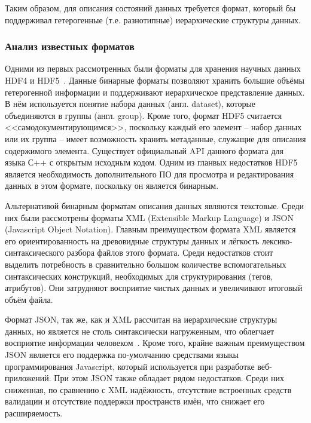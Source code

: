 Таким образом, для описания состояний данных требуется формат, который бы поддерживал гетерогенные (т.е. разнотипные) иерархические структуры данных.

\subsubsection{Анализ известных форматов}

Одними из первых рассмотренных были форматы для хранения научных данных HDF4 и HDF5~\cite{HDFOffCite}. Данные бинарные форматы позволяют хранить большие объёмы гетерогенной информации и поддерживают иерархическое представление данных. В нём используется понятие набора данных (англ. dataset), которые объединяются в группы (англ. group). Кроме того, формат HDF5 считается <<самодокументирующимся>>, поскольку каждый его элемент -- набор данных или их группа -- имеет возможность хранить метаданные, служащие для описания содержимого элемента. Существует официальный API данного формата для языка С++ с открытым исходным кодом. Одним из гланвых недостатков HDF5 является необходимость дополнительного ПО для просмотра и редактирования данных в этом формате, поскольку он является бинарным.

Альтернативой бинарным форматам описания данных являются текстовые. Среди них были рассмотрены форматы XML (Extensible Markup Language) и JSON (Javascript Object Notation). Главным преимуществом формата XML является его ориентированность на древовидные структуры данных и лёгкость лексико-синтаксического разбора файлов этого формата. Среди недостатков стоит выделить потребность в сравнительно большом количестве вспомогательных синтаксических конструкций, необходимых для структурирования (тегов, атрибутов). Они затрудняют восприятие чистых данных и увеличивают итоговый объём файла. 

Формат JSON, так же, как и XML рассчитан на иерархические структуры данных, но является не столь синтаксически нагруженным, что облегчает восприятие информации человеком~\cite{JSONvsXML}. Кроме того, крайне важным преимуществом JSON является его поддержка по-умолчанию средствами языкы программирования Javascript, который используется при разработке веб-приложений. При этом JSON также обладает рядом недостатков. Среди них сниженная, по сравнению с XML надёжность, отсутствие встроенных средств валидации и отсутствие поддержки пространств имён, что снижает его расширяемость.


\noteattributes{}
